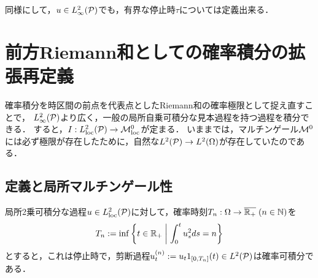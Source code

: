 \documentclass[uplatex,dvipdfmx]{jsreport}
\begin{document}
\begin{corollary}
    同様にして，$u\in L^2_\infty(\P)$でも，有界な停止時$\tau$については定義出来る．
\end{corollary}

\section{前方Riemann和としての確率積分の拡張再定義}

\begin{tcolorbox}[colframe=ForestGreen, colback=ForestGreen!10!white,breakable,colbacktitle=ForestGreen!40!white,coltitle=black,fonttitle=\bfseries\sffamily,
title=]
    確率積分を時区間の前点を代表点としたRiemann和の確率極限として捉え直すことで，
    $L^2_\infty(\P)$より広く，一般の局所自乗可積分な見本過程を持つ過程を積分できる．
    すると，$I:L^2_\loc(\P)\to\M^0_\loc$が定まる．
    いままでは，マルチンゲール$\M^0$には必ず極限が存在したために，自然な$L^2(\P)\to L^2(\Om)$が存在していたのである．
\end{tcolorbox}

\subsection{定義と局所マルチンゲール性}

\begin{lemma}
    局所2乗可積分な過程$u\in L^2_\loc(\P)$に対して，確率時刻$T_n:\Om\to\o{\R_+}\;(n\in\N)$を
    \[T_n:=\inf\Brace{t\in\R_+\;\middle|\;\int^t_0u_s^2ds=n}\]
    とすると，これは停止時で，剪断過程$u_t^{(n)}:=u_t1_{[0,T_n]}(t)\in L^2(\P)$は確率可積分である．
\end{lemma}
\end{document}
